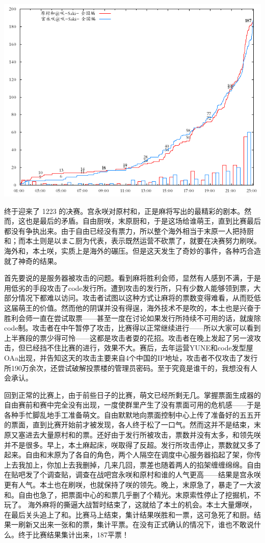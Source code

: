 \includegraphics[width=.45\textwidth]{images/graph1223.png}

终于迎来了 1223 的决赛。宫永咲对原村和，正是麻将写出的最精彩的剧本。然而，这也是最后的矛盾。自由厨咲，末原厨和，于是这场给谁萌王，直到比赛最后都没有争执出来。由于自由已经没有票力，所以整个海外相当于末原一人把持厨和；而本土则是以まこ厨为代表，表示既然运营不砍票了，就要在决赛努力刷咲。海外和，本土咲，实质上是海外的碾压。但是这天发生了奇妙的事件，各种巧合造就了神奇的结果。

首先要说的是服务器被攻击的问题。看到麻将胜利会师，显然有人感到不满，于是用低劣的手段攻击了code发行所。遭到攻击的发行所，只有少数人能够领到票，大部分情况下都难以访问。攻击者试图以这种方式让麻将的票数变得难看，从而贬低这届萌王的价值。然而他的阴谋并没有得逞，海外技术不是吹的，本土也是兴奋于胜利会师一直在尝试取票——甚至一度在讨论如果发行所持续不可用的话，就废除code制。攻击者在中午暂停了攻击，比赛得以正常继续进行——所以大家可以看到上半赛段的票少得可怜——这都是攻击者耍的花招。攻击者在晚上发起了另一波攻击，但已经挡不住比赛的进行，效果不大。赛后，去年运营YUNE和code发型屋OAa出现，并告知这天的攻击主要来自4个中国的IP地址，攻击者不仅攻击了发行所190万余次，还尝试破解投票楼的管理员密码。至于究竟是谁干的，我想没有人会承认。

回到正常的比赛上，由于前些日子的比赛，萌文已经所剩无几。掌握票面生成器的自由赛前和赛中完全没有出现，一度使群里产生了没有票面可用的危机感——于是各种手忙脚乱地手工准备萌文。自由默默地向票面控制中心上传了准备好的五五开的票面，直到比赛开始前才被发现，各人终于松了一口气。然而这并不是结束，末原又塞进去大量原村和的票。还好由于发行所被攻击，票数并没有太多，和领先咲并不是很多。早上，本土麻起床，咲取得了反超。发行所攻击停止，票数就又多了起来。自由和末原为了各自的角色，两个人隔空在调度中心服务器掐起了架，你传上去我加上，你加上去我删掉，几来几回，票差也随着两人的掐架缠缠绵绵。自由在贴吧发了个调查贴，调查在战吧宫永咲和原村和谁的人气更高——结果是宫永咲更有人气。本土也在刷咲，也就保持了咲的领先。晚上，末原急了，暴走了一大波和。自由也急了，把票面中心的和票几乎删了个精光。末原索性停止了挖掘机，不玩了。
海外麻将的撕逼大战暂时结束了，这就给了本土的机会。本土大量爆咲，在最后关头追上了和。比赛马上结束，集计结果咲胜和一票，这可急死了和厨。结果一刷新又出来一张和的票，集计平票。在没有正式确认的情况下，谁也不敢说什么。终于比赛结果集计出来，187平票！

